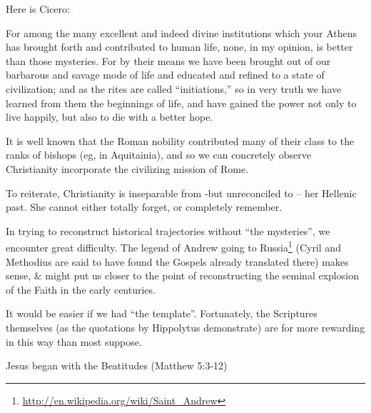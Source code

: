 Here is Cicero:

\begin{quotex}
For among the many excellent and indeed divine institutions which your Athens has brought forth and contributed to human life, none, in my opinion, is better than those mysteries. For by their means we have been brought out of our barbarous and savage mode of life and educated and refined to a state of civilization; and as the rites are called ``initiations,'' so in very truth we have learned from them the beginnings of life, and have gained the power not only to live happily, but also to die with a better hope.
\end{quotex}


It is well known that the Roman nobility contributed many of their class to the ranks of bishops (eg, in Aquitainia), and so we can concretely observe Christianity incorporate the civilizing mission of Rome.

To reiterate, Christianity is inseparable from -but unreconciled to -- her Hellenic past. She cannot either totally forget, or completely remember.

In trying to reconstruct historical trajectories without ``the mysteries'', we encounter great difficulty. The legend of Andrew going to Russia\footnote{\url{http://en.wikipedia.org/wiki/Saint\_Andrew}} (Cyril and Methodius are said to have found the Gospels already translated there) makes sense, \& might put us closer to the point of reconstructing the seminal explosion of the Faith in the early centuries.

It would be easier if we had ``the template''. Fortunately, the Scriptures themselves (as the quotations by Hippolytus demonstrate) are for more rewarding in this way than most suppose.

Jesus began with the Beatitudes (Matthew 5:3-12)

